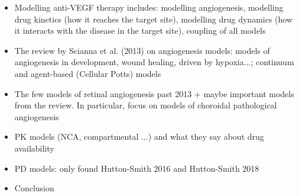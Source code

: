 \documentclass[11pt,a4paper, twocolumn]{article}
\begin{document}
\newpage

\begin{itemize}
\item Modelling anti-VEGF therapy includes: modelling angiogenesis, modelling drug kinetics (how it reaches the target site), modelling drug dynamics (how it interacts with the disease in the target site), coupling of all models
\item The review by Scianna et al. (2013) on angiogenesis models: models of angiogenesis in development, wound healing, driven by hypoxia...; continuum and agent-based (Cellular Potts) models
\item The few models of retinal angiogenesis past 2013 + maybe important models from the review. In particular, focus on models of choroidal pathological angiogenesis 
\item PK models (NCA, compartmental ...) and what they say about drug availability
\item PD models: only found Hutton-Smith 2016 and Hutton-Smith 2018
\item Conclusion
\end{itemize}


{\normalsize }
\end{document}
